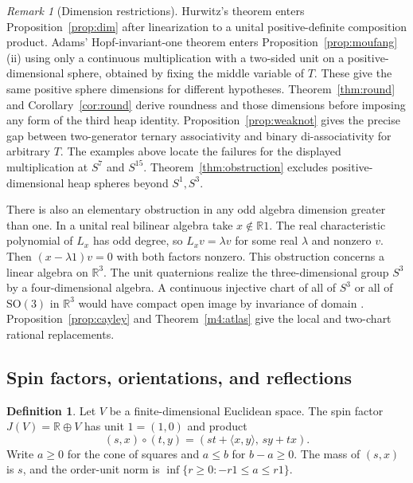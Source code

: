 \documentclass[11pt,reqno]{amsart}
\theoremstyle{definition}
\newtheorem{definition}[theorem]{Definition}
\theoremstyle{remark}
\newtheorem{remark}[theorem]{Remark}
\numberwithin{equation}{section}
\newcommand{\R}{\mathbb{R}}
\newcommand{\ip}[2]{\langle #1,#2\rangle}
\newcommand{\SO}{\mathrm{SO}}
\begin{document}
\begin{remark}[Dimension restrictions]\label{m10:restrictions}
Hurwitz's theorem \cite{Hurwitz1898,SV00} enters Proposition~\ref{prop:dim} after
linearization to a unital positive-definite composition product.
Adams' Hopf-invariant-one theorem \cite{Adams} enters
Proposition~\ref{prop:moufang}(ii) using only a continuous
multiplication with a two-sided unit on a positive-dimensional
sphere, obtained by fixing the middle variable of \(T\).
These give the same positive sphere dimensions for different
hypotheses. Theorem~\ref{thm:round} and Corollary~\ref{cor:round}
derive roundness and those dimensions before imposing any form of the
third heap identity. Proposition~\ref{prop:weaknot} gives the precise
gap between two-generator ternary associativity and binary
di-associativity for arbitrary \(T\). The examples above locate the
failures for the displayed multiplication at \(S^7\) and \(S^{15}\).
Theorem~\ref{thm:obstruction} excludes positive-dimensional heap
spheres beyond \(S^1,S^3\).

There is also an elementary obstruction in any odd algebra dimension
greater than one. In a unital real bilinear algebra take
\(x\notin\R 1\). The real characteristic polynomial of \(L_x\) has odd
degree, so \(L_x v=\lambda v\) for some real \(\lambda\) and nonzero
\(v\). Then \((x-\lambda 1)v=0\) with both factors nonzero. This
obstruction concerns a linear algebra on \(\R^3\). The unit
quaternions realize the three-dimensional group \(S^3\) by a
four-dimensional algebra. A continuous injective chart of all of
\(S^3\) or all of \(\SO(3)\) in \(\R^3\) would have compact open
image by invariance of domain \cite{d4-brouwer}. Proposition~\ref{prop:cayley}
and Theorem~\ref{m4:atlas} give the local and two-chart rational
replacements.
\end{remark}

\subsection{Spin factors, orientations, and reflections}

\begin{definition}\label{m10:spin}
Let \(V\) be a finite-dimensional Euclidean space. The spin factor
\(J(V)=\R\oplus V\) has unit \(1=(1,0)\) and product
\[
 (s,x)\circ(t,y)=(st+\ip{x}{y},\,sy+tx).
\]
Write \(a\ge0\) for the cone of squares and \(a\le b\) for \(b-a\ge0\).
The mass of \((s,x)\) is \(s\), and the order-unit norm is
\(\inf\{r\ge0:-r1\le a\le r1\}\).
\end{definition}
\end{document}
